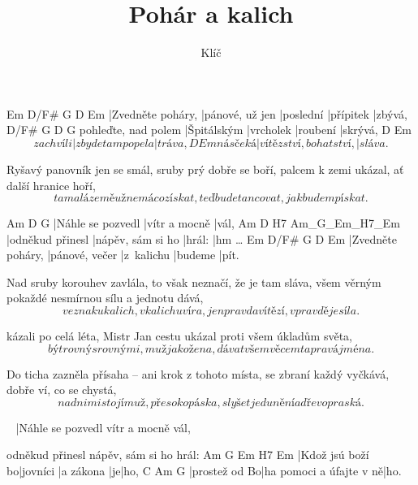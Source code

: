 \documentclass{song}
\title{Pohár a kalich}
\author{Klíč}
\begin{document}
\strophe
Em                D/F#            G         D         Em
|Zvedněte poháry, |pánové, už jen |poslední |přípitek |zbývá,
                    D/F#        G         D        G
pohleďte, nad polem |Špitálským |vrcholek |roubení |skrývá,
             D                  Em
\[ za chvíli |zbyde tam popel a |tráva,
         D                      Em
nás čeká |vítězství, bohatství, |sláva. \]
\endstrophe

\strophe*
Ryšavý panovník jen se smál, sruby prý dobře se boří,
palcem k zemi ukázal, ať další hranice hoří,
\[ ta malá země už nemá co získat,
teď bude tancovat, jak budem pískat. \]
\endstrophe

Am                D             G
|Náhle se pozvedl |vítr a mocně |vál,
Am               D                 H7     Am_G_Em_H7_Em
|odněkud přinesl |nápěv, sám si ho |hrál: |hm \ldots{}
Em                D/F#           G          D       Em
|Zvedněte poháry, |pánové, večer |z~kalichu |budeme |pít.
\endstrophe

\strophe*
Nad sruby korouhev zavlála, to však neznačí, že je tam sláva,
všem věrným pokaždé nesmírnou sílu a jednotu dává,
\[ ve znaku kalich, v kalichu víra,
jen pravda vítězí, v pravdě je síla. \]
\endstrophe

\strophe*
{} kázali po celá léta,
Mistr Jan cestu ukázal proti všem úkladům světa,
\[ být rovný s rovnými, muž jako žena,
dávat všem věcem ta pravá jména. \]
\endstrophe

\strophe*
Do ticha zazněla přísaha -- ani krok z tohoto místa,
se zbraní každý vyčkává, dobře ví, co se chystá,
\[ nad nimi stojí muž, přes oko páska,
slyšet je dunění a dřevo praská. \]
\endstrophe

~
|Náhle se pozvedl vítr a mocně vál,

odněkud přinesl nápěv, sám si ho hrál:
Am               G        Em        H7 Em
|Kdož jsú boží bo|jovníci |a zákona |je|ho,
C             Am                      G
|prostež od Bo|ha pomoci a úfajte v ně|ho.
\endstrophe
\end{document}
